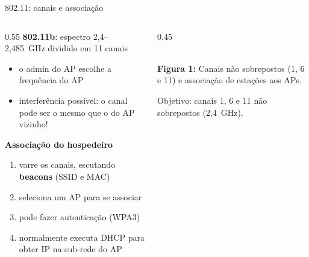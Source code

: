 \documentclass[aspectratio=169,11pt]{beamer}
\begin{document}
\begin{frame}{802.11: canais e associação}
  \begin{columns}
    \begin{column}{0.55\textwidth}
      \textbf{802.11b}: espectro 2,4--2,485~GHz dividido em 11 canais
      \begin{itemize}
        \item o admin do AP escolhe a frequência do AP
        \item interferência possível: o canal pode ser o mesmo que o do AP vizinho!
      \end{itemize}
      \textbf{Associação do hospedeiro}
      \begin{enumerate}
        \item varre os canais, escutando \textbf{beacons} (SSID e MAC)
        \item seleciona um AP para se associar
        \item pode fazer autenticação (WPA3)
        \item normalmente executa DHCP para obter IP na sub-rede do AP
      \end{enumerate}
    \end{column}
    \begin{column}{0.45\textwidth}
      \begin{center}
        \\[1mm]
        {\scriptsize \textbf{Figura 1:} Canais não sobrepostos (1, 6 e 11) e associação de estações aos APs.}
      \end{center}
      {\scriptsize Objetivo: canais 1, 6 e 11 não sobrepostos (2,4~GHz).}
    \end{column}
  \end{columns}
\end{frame}
\end{document}
